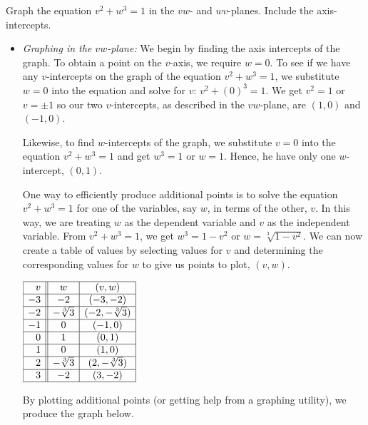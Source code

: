 \documentclass{ximera}
\begin{document}
\begin{example}   \label{firstequgraph} Graph the equation $v^2 + w^3 = 1$ in  the $vw$- and $wv$-planes.  Include the axis-intercepts. 

\begin{explanation}

\begin{itemize}

\item \textit{Graphing in the $vw$-plane:}  We begin by finding the axis intercepts of the graph.  To obtain a point on the $v$-axis, we require $w = 0$.  To see if we have any $v$-intercepts on the graph of the equation $v^2+w^3 = 1$, we substitute $w=0$ into the equation and solve for $v$:  $v^2 + (0)^3 = 1$.  We get $v^2 = 1$ or $v = \pm 1$ so our two $v$-intercepts, as described in the $vw$-plane, are $(1,0)$ and $(-1,0)$. 

Likewise, to find $w$-intercepts of the graph, we substitute $v = 0$ into the equation $v^2+w^3 = 1$ and get $w^3 = 1$ or $w = 1$. Hence, he have only one $w$-intercept, $(0,1)$.  

One way to efficiently produce additional points is to solve the equation $v^2+w^3 = 1$ for one of the variables, say $w$, in terms of the other, $v$.  In this way, we are treating $w$ as the dependent variable and $v$ as the independent variable.  From  $v^2 + w^3 = 1$, we get $w^3 = 1 - v^2$ or $w = \sqrt[3]{1-v^2}$.  We can now create a table of values by selecting values for $v$ and determining the corresponding values for $w$ to give us points to plot, $(v, w)$.

\begin{center}
$\begin{array}{|r||c|c|}  \hline

  v & w & (v,w) \\ \hline
 -3 & -2 & (-3, -2) \\  \hline
 -2 & -\sqrt[3]{3}& (-2,-\sqrt[3]{3}) \\  \hline
 -1 & 0 & ( -1, 0) \\  \hline
  0 & 1& ( 0 , 1) \\  \hline
  1 & 0 & ( 1, 0) \\  \hline
  2 & -\sqrt[3]{3}& (2,-\sqrt[3]{3}) \\  \hline
  3 & -2 & (3, -2) \\  \hline
\end{array}$
\end{center}


By plotting additional points (or getting help from a graphing utility), we produce the graph below.
 

\end{itemize}
\end{explanation}
\end{example}
\end{document}
